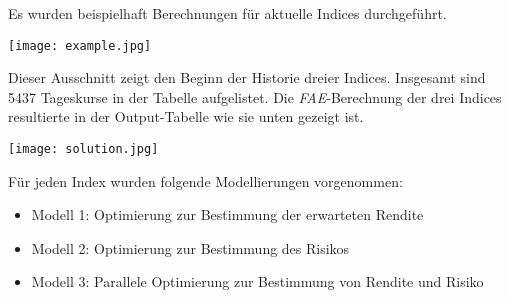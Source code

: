 \documentclass{scrartcl}
\begin{document}
Es wurden beispielhaft Berechnungen für aktuelle Indices durchgeführt. 

\begin{center}
\texttt{[image: example.jpg]}
\end{center}

Dieser Ausschnitt zeigt den Beginn der Historie dreier Indices. Insgesamt sind 5437 Tageskurse in der Tabelle aufgelistet. Die \textit{FAE}-Berechnung der drei Indices resultierte in der Output-Tabelle wie sie unten gezeigt ist.

\begin{center}
\texttt{[image: solution.jpg]}
\end{center}

Für jeden Index wurden folgende Modellierungen vorgenommen: 

\begin{itemize}
\item{Modell 1: Optimierung zur Bestimmung der erwarteten Rendite}
\item{Modell 2: Optimierung zur Bestimmung des Risikos}
\item{Modell 3: Parallele Optimierung zur Bestimmung von Rendite und Risiko} 
\end{itemize}
\end{document}

